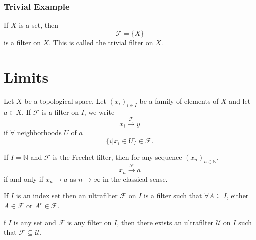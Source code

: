 \documentclass[12pt]{article}
\newenvironment{definition}[2][Definition]{\begin{trivlist}
\item[\hskip \labelsep {\bfseries #1}\hskip \labelsep {\bfseries #2.}]}{\end{trivlist}}
\newenvironment{theorem}[2][Theorem]{\begin{trivlist}
\item[\hskip \labelsep {\bfseries #1}\hskip \labelsep {\bfseries #2.}]}{\end{trivlist}}
\newenvironment{remark}[2][Remark]{\begin{trivlist}
\item[\hskip \labelsep {\bfseries #1}\hskip \labelsep {\bfseries #2.}]}{\end{trivlist}}
\begin{document}
\subsubsection{Trivial Example}
If $X$ is a set, then
\[
\mathcal{F} = \{ X \}
\]
is a filter on $X$.  This is called the trivial filter on $X$.

\section{Limits}
Let $X$ be a topological space.  Let $(x_i)_{i \in I}$ be a family of elements of $X$ and let $a \in X$.  If $\mathcal{F}$ is a filter on $I$, we write
\[
x_i \xrightarrow{\mathcal{F}} y
\]
if $\forall$ neighborhoods $U$ of $a$
\[
\{ i | x_i \in U \} \in \mathcal{F}.
\]

\begin{remark}{}
If $I = \mathbb{N}$ and $\mathcal{F}$ is the Frechet filter, then for any sequence $(x_n)_{n \in \mathbb{N}}$,
\[
x_n \xrightarrow{\mathcal{F}} a
\]
if and only if $x_n \rightarrow a$ as $n \rightarrow \infty$ in the classical sense.
\end{remark}

\begin{definition}{Ultrafilter}
If $I$ is an index set then an ultrafilter $\mathcal{F}$ on $I$ is a filter such that $\forall A \subseteq I$, either $A \in \mathcal{F}$ or $A^c \in \mathcal{F}$.
\end{definition}

\begin{theorem}
If $I$ is any set and $\mathcal{F}$ is any filter on $I$, then there exists an ultrafilter $\mathcal{U}$ on $I$ such that $\mathcal{F} \subseteq \mathcal{U}$.
\end{theorem}
\end{document}
